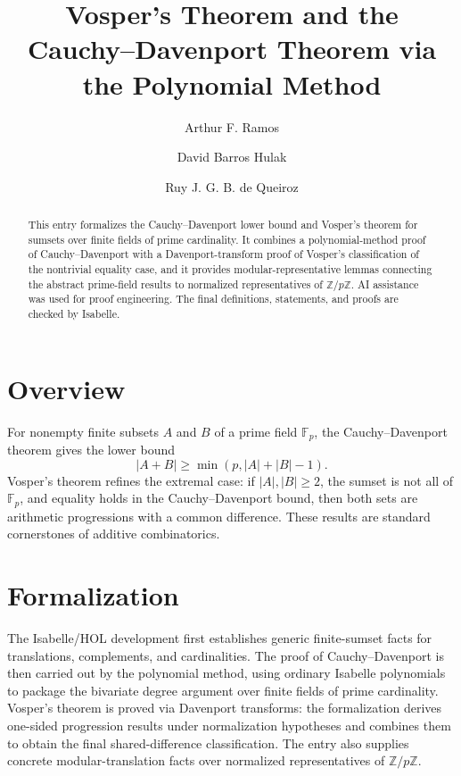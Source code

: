 \documentclass[11pt,a4paper]{article}
\begin{document}
\title{Vosper's Theorem and the Cauchy--Davenport Theorem via the Polynomial Method}
\author{Arthur F. Ramos \and David Barros Hulak \and Ruy J. G. B. de Queiroz}
\maketitle

\begin{abstract}
This entry formalizes the Cauchy--Davenport lower bound and Vosper's theorem
for sumsets over finite fields of prime cardinality. It combines a
polynomial-method proof of Cauchy--Davenport with a Davenport-transform proof of
Vosper's classification of the nontrivial equality case, and it provides
modular-representative lemmas connecting the abstract prime-field results to
normalized representatives of $\mathbb{Z}/p\mathbb{Z}$. AI assistance was used
for proof engineering. The final definitions, statements, and proofs are checked by
Isabelle.
\end{abstract}

\section{Overview}

For nonempty finite subsets $A$ and $B$ of a prime field $\mathbb{F}_p$, the
Cauchy--Davenport theorem gives the lower bound
\[
  |A + B| \geq \min(p, |A| + |B| - 1).
\]
Vosper's theorem refines the extremal case: if $|A|, |B| \geq 2$, the sumset is
not all of $\mathbb{F}_p$, and equality holds in the Cauchy--Davenport bound,
then both sets are arithmetic progressions with a common difference. These
results are standard cornerstones of additive combinatorics.

\section{Formalization}

The Isabelle/HOL development first establishes generic finite-sumset facts for
translations, complements, and cardinalities. The proof of Cauchy--Davenport is
then carried out by the polynomial method, using ordinary Isabelle polynomials
to package the bivariate degree argument over finite fields of prime
cardinality. Vosper's theorem is proved via Davenport transforms: the
formalization derives one-sided progression results under normalization
hypotheses and combines them to obtain the final shared-difference
classification. The entry also supplies concrete modular-translation facts over
normalized representatives of $\mathbb{Z}/p\mathbb{Z}$.
\end{document}
